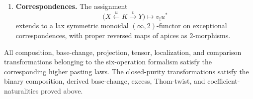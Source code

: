 \begin{theorem}
\begin{enumerate}
    \item \textbf{Correspondences.}
    The assignment
    \[
        \bigl(
          X\xleftarrow{u}K\xrightarrow{v}Y
        \bigr)
        \longmapsto
        v_!u^*
    \]
    extends to a lax symmetric monoidal \((\infty,2)\)-functor on
    exceptional correspondences, with proper reversed maps of apices as
    \(2\)-morphisms.
\end{enumerate}

All composition, base-change, projection, tensor, localization, and
comparison transformations belonging to the six-operation formalism satisfy
the corresponding higher pasting laws.  The closed-purity transformations
satisfy the binary composition, derived base-change, excess, Thom-twist, and
coefficient-naturalities proved above.
\end{theorem}

